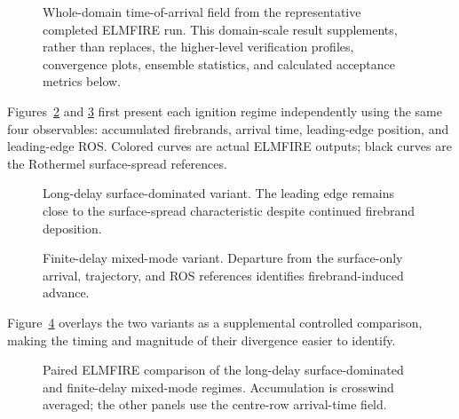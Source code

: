 \begin{figure}[H]
\centering
{}
\caption{Whole-domain time-of-arrival field from the representative completed ELMFIRE run.  This
domain-scale result supplements, rather than replaces, the higher-level verification
profiles, convergence plots, ensemble statistics, and calculated acceptance metrics below.}
\label{fig:domain-result}
\end{figure}


Figures~\ref{fig:surface-dominated-reference} and
\ref{fig:mixed-mode-reference} first present each ignition regime independently
using the same four observables: accumulated firebrands, arrival time,
leading-edge position, and leading-edge ROS. Colored curves are actual ELMFIRE
outputs; black curves are the Rothermel surface-spread references.

\begin{figure}[H]
\centering
{}
\caption{Long-delay surface-dominated variant. The leading edge remains close
to the surface-spread characteristic despite continued firebrand deposition.}
\label{fig:surface-dominated-reference}
\end{figure}

\begin{figure}[H]
\centering
{}
\caption{Finite-delay mixed-mode variant. Departure from the surface-only
arrival, trajectory, and ROS references identifies firebrand-induced advance.}
\label{fig:mixed-mode-reference}
\end{figure}

Figure~\ref{fig:delay-effect} overlays the two variants as a supplemental
controlled comparison, making the timing and magnitude of their divergence
easier to identify.

\begin{figure}[H]
\centering
{}
\caption{Paired ELMFIRE comparison of the long-delay surface-dominated and
finite-delay mixed-mode regimes. Accumulation is crosswind averaged; the other
panels use the centre-row arrival-time field.}
\label{fig:delay-effect}
\end{figure}
\FloatBarrier


